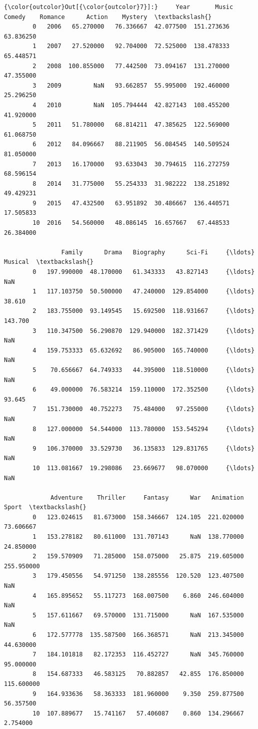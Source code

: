 \documentclass[11pt]{article}
\begin{document}
\begin{Verbatim}[commandchars=\\\{\}]
{\color{outcolor}Out[{\color{outcolor}7}]:}     Year       Music      Comedy    Romance      Action    Mystery  \textbackslash{}
        0   2006   65.270000   76.336667  42.077500  151.273636  63.836250   
        1   2007   27.520000   92.704000  72.525000  138.478333  65.448571   
        2   2008  100.855000   77.442500  73.094167  131.270000  47.355000   
        3   2009         NaN   93.662857  55.995000  192.460000  25.296250   
        4   2010         NaN  105.794444  42.827143  108.455200  41.920000   
        5   2011   51.780000   68.814211  47.385625  122.569000  61.068750   
        6   2012   84.096667   88.211905  56.084545  140.509524  81.050000   
        7   2013   16.170000   93.633043  30.794615  116.272759  68.596154   
        8   2014   31.775000   55.254333  31.982222  138.251892  49.429231   
        9   2015   47.432500   63.951892  30.486667  136.440571  17.505833   
        10  2016   54.560000   48.086145  16.657667   67.448533  26.384000   
        
                Family      Drama   Biography      Sci-Fi     {\ldots}      Musical  \textbackslash{}
        0   197.990000  48.170000   61.343333   43.827143     {\ldots}          NaN   
        1   117.103750  50.500000   47.240000  129.854000     {\ldots}       38.610   
        2   183.755000  93.149545   15.692500  118.931667     {\ldots}      143.700   
        3   110.347500  56.290870  129.940000  182.371429     {\ldots}          NaN   
        4   159.753333  65.632692   86.905000  165.740000     {\ldots}          NaN   
        5    70.656667  64.749333   44.395000  118.510000     {\ldots}          NaN   
        6    49.000000  76.583214  159.110000  172.352500     {\ldots}       93.645   
        7   151.730000  40.752273   75.484000   97.255000     {\ldots}          NaN   
        8   127.000000  54.544000  113.780000  153.545294     {\ldots}          NaN   
        9   106.370000  33.529730   36.135833  129.831765     {\ldots}          NaN   
        10  113.081667  19.298086   23.669677   98.070000     {\ldots}          NaN   
        
             Adventure    Thriller     Fantasy      War   Animation       Sport  \textbackslash{}
        0   123.024615   81.673000  158.346667  124.105  221.020000   73.606667   
        1   153.278182   80.611000  131.707143      NaN  138.770000   24.850000   
        2   159.570909   71.285000  158.075000   25.875  219.605000  255.950000   
        3   179.450556   54.971250  138.285556  120.520  123.407500         NaN   
        4   165.895652   55.117273  168.007500    6.860  246.604000         NaN   
        5   157.611667   69.570000  131.715000      NaN  167.535000         NaN   
        6   172.577778  135.587500  166.368571      NaN  213.345000   44.630000   
        7   184.101818   82.172353  116.452727      NaN  345.760000   95.000000   
        8   154.687333   46.583125   70.882857   42.855  176.850000  115.600000   
        9   164.933636   58.363333  181.960000    9.350  259.877500   56.357500   
        10  107.889677   15.741167   57.406087    0.860  134.296667    2.754000   
        

\end{Verbatim}
\end{document}
